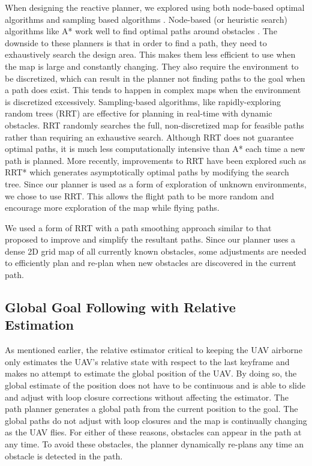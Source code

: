 \documentclass[letterpaper, 10 pt, conference]{ieeeconf}  %
\begin{document}
When designing the reactive planner, we explored using both node-based optimal algorithms and sampling based algorithms \cite{Yang2016}. Node-based (or heuristic search) algorithms like A* work well to find optimal paths around obstacles \cite{Nilsson2011}. The downside to these planners is that in order to find a path, they need to exhaustively search the design area. This makes them less efficient to use when the map is large and constantly changing. They also require the environment to be discretized, which can result in the planner not finding paths to the goal when a path does exist. This tends to happen in complex maps when the environment is discretized excessively. Sampling-based algorithms, like rapidly-exploring random trees (RRT) \cite{Lavalle1998} are effective for planning in real-time with dynamic obstacles. RRT randomly searches the full, non-discretized map for feasible paths rather than requiring an exhaustive search. Although RRT does not guarantee optimal paths, it is much less computationally intensive than A* each time a new path is planned. More recently, improvements to RRT have been explored such as RRT* \cite{Karaman2011} which generates asymptotically optimal paths by modifying the search tree. Since our planner is used as a form of exploration of unknown environments, we chose to use RRT. This allows the flight path to be more random and encourage more exploration of the map while flying paths.

We used a form of RRT with a path smoothing approach similar to that proposed \cite{Beard2012} to improve and simplify the resultant paths. Since our planner uses a dense 2D grid map of all currently known obstacles, some adjustments are needed to efficiently plan and re-plan when new obstacles are discovered in the current path.

\subsection{Global Goal Following with Relative Estimation}

As mentioned earlier, the relative estimator critical to keeping the UAV airborne only estimates the UAV's relative state with respect to the last keyframe and makes no attempt to estimate the global position of the UAV. By doing so, the global estimate of the position does not have to be continuous and is able to slide and adjust with loop closure corrections without affecting the estimator. The path planner generates a global path from the current position to the goal. The global paths do not adjust with loop closures and the map is continually changing as the UAV flies. For either of these reasons, obstacles can appear in the path at any time. To avoid these obstacles, the planner dynamically re-plans any time an obstacle is detected in the path.
\end{document}
